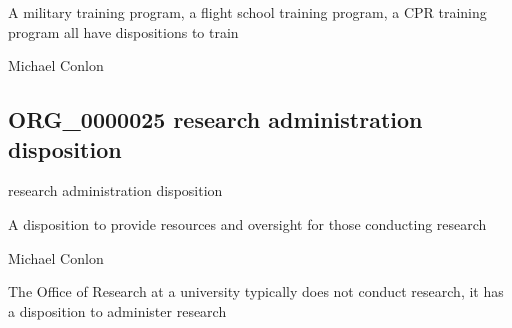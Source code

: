 \documentclass[letterpaper,10pt,english]{sphinxmanual}
\begin{document}
\begin{sphinxShadowBox}

\sphinxAtStartPar
A military training program, a flight school training program, a CPR training program all have dispositions to train
\end{sphinxShadowBox}

\begin{sphinxShadowBox}

\sphinxAtStartPar
Michael Conlon 
\end{sphinxShadowBox}
\begin{quote}

\ignorespaces \end{quote}


\subsection{ORG\_0000025 \sphinxhyphen{} research administration disposition}
\label{\detokenize{doc-ORG_0000025:org-0000025-research-administration-disposition}}\label{\detokenize{doc-ORG_0000025:index-0}}\label{\detokenize{doc-ORG_0000025::doc}}
\begin{sphinxShadowBox}

\sphinxAtStartPar
research administration disposition
\end{sphinxShadowBox}

\begin{sphinxShadowBox}

\sphinxAtStartPar
A disposition to provide resources and oversight for those conducting research
\end{sphinxShadowBox}

\begin{sphinxShadowBox}

\sphinxAtStartPar
Michael Conlon 
\end{sphinxShadowBox}

\begin{sphinxShadowBox}

\sphinxAtStartPar
The Office of Research at a university typically does not conduct research, it has a disposition to administer research
\end{sphinxShadowBox}
\end{document}
